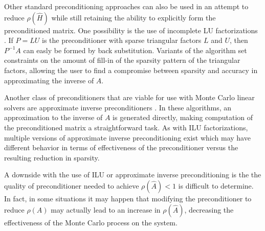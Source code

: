 Other standard preconditioning approaches can also be used in an attempt
to reduce $\rho(\hat{H})$ while still retaining the ability to explicitly
form the preconditioned matrix.  One possibility is the use of incomplete
LU factorizations \cite{Saad,Benzi2002}.  If $P=LU$ is the preconditioner
with sparse triangular factors $L$ and $U$, then $P^{-1}A$ can easly be
formed by back substitution.
Variants of the algorithm set constraints on the amount of fill-in
of the sparsity pattern of the triangular factors, allowing the user to
find a compromise between sparsity and accuracy in
approximating the inverse of $A$.

Another class of preconditioners that are viable for use with Monte Carlo
linear solvers are approximate inverse preconditioners
\cite{Saad,Benzi2002,Tuma1996,Tuma1998}.  In these algorithms, an approximation
to the inverse of $A$ is generated directly, making computation of the
preconditioned matrix a straightforward task.  As with ILU factorizations,
multiple versions of approximate inverse preconditioning exist which may
have different behavior in terms of effectiveness of the preconditioner
versus the resulting reduction in sparsity.

A downside with the use of ILU or approximate inverse preconditioning is the
the quality of preconditioner needed to achieve $\rho(\hat{A})<1$ is
difficult to determine.  In fact, in some situations it may happen that
modifying the preconditioner to reduce $\rho(A)$ may actually lead to an
increase in $\rho(\hat{A})$, decreasing the effectiveness of the Monte
Carlo process on the system.


